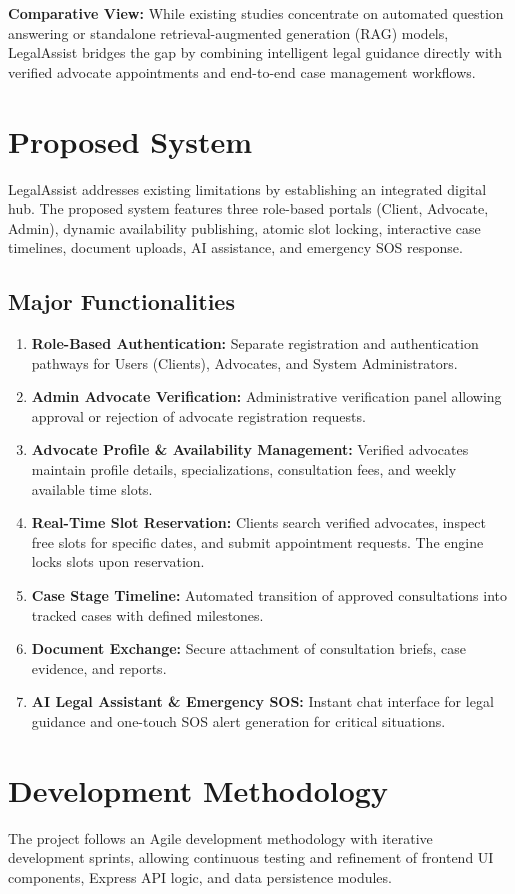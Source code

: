 \documentclass[12pt,a4paper]{report}
\begin{document}
\noindent \textbf{Comparative View:} While existing studies concentrate on automated question answering or standalone retrieval-augmented generation (RAG) models, LegalAssist bridges the gap by combining intelligent legal guidance directly with verified advocate appointments and end-to-end case management workflows.

\section{Proposed System}
LegalAssist addresses existing limitations by establishing an integrated digital hub. The proposed system features three role-based portals (Client, Advocate, Admin), dynamic availability publishing, atomic slot locking, interactive case timelines, document uploads, AI assistance, and emergency SOS response.

\subsection{Major Functionalities}
\begin{enumerate}
    \item \textbf{Role-Based Authentication:} Separate registration and authentication pathways for Users (Clients), Advocates, and System Administrators.
    \item \textbf{Admin Advocate Verification:} Administrative verification panel allowing approval or rejection of advocate registration requests.
    \item \textbf{Advocate Profile \& Availability Management:} Verified advocates maintain profile details, specializations, consultation fees, and weekly available time slots.
    \item \textbf{Real-Time Slot Reservation:} Clients search verified advocates, inspect free slots for specific dates, and submit appointment requests. The engine locks slots upon reservation.
    \item \textbf{Case Stage Timeline:} Automated transition of approved consultations into tracked cases with defined milestones.
    \item \textbf{Document Exchange:} Secure attachment of consultation briefs, case evidence, and reports.
    \item \textbf{AI Legal Assistant \& Emergency SOS:} Instant chat interface for legal guidance and one-touch SOS alert generation for critical situations.
\end{enumerate}

\section{Development Methodology}
The project follows an Agile development methodology with iterative development sprints, allowing continuous testing and refinement of frontend UI components, Express API logic, and data persistence modules.
\end{document}
